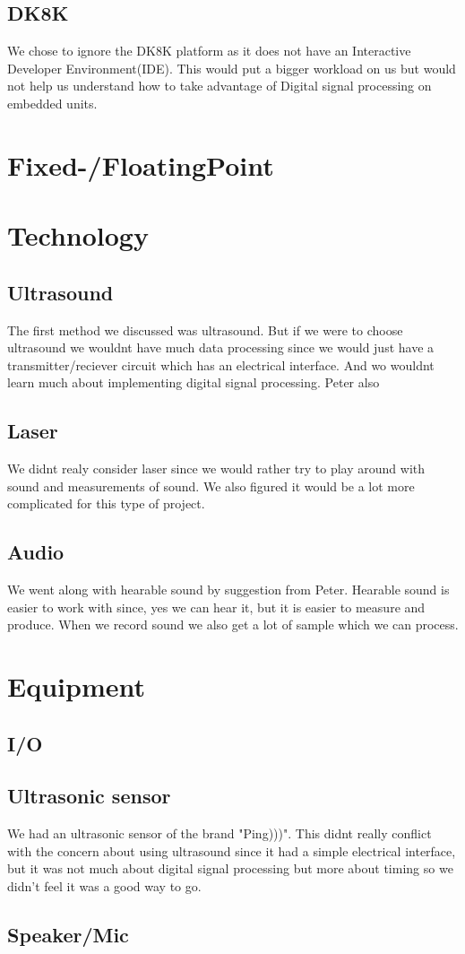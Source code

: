 \subsection{DK8K}
We chose to ignore the DK8K platform as it does not have an Interactive Developer Environment(IDE). This would put a bigger workload on us but would not help us understand how to take advantage of Digital signal processing on embedded units.
\section{Fixed-/FloatingPoint}
\section{Technology}
\subsection{Ultrasound}
The first method we discussed was ultrasound. But if we were to choose ultrasound we wouldnt have much data processing since we would just have a transmitter/reciever circuit which has an electrical interface. And wo wouldnt learn much about implementing digital signal processing. Peter also 

\subsection{Laser}
We didnt realy consider laser since we would rather try to play around with sound and measurements of sound. We also figured it would be a lot more complicated for this type of project.

\subsection{Audio}
We went along with hearable sound by suggestion from Peter. Hearable sound is easier to work with since, yes we can hear it, but it is easier to measure and produce. When we record sound we also get a lot of sample which we can process.

\section{Equipment}
\subsection{I/O}

\subsection{Ultrasonic sensor}
We had an ultrasonic sensor of the brand "Ping)))". This didnt really conflict with the concern about using ultrasound since it had a simple electrical interface, but it was not much about digital signal processing but more about timing so we didn't feel it was a good way to go.
\subsection{Speaker/Mic}